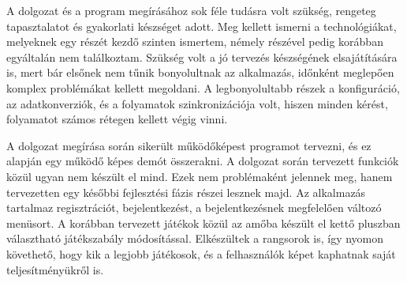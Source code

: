 


A dolgozat és a program megírásához sok féle tudásra volt szükség, rengeteg tapasztalatot és gyakorlati készséget adott. Meg kellett ismerni a technológiákat, melyeknek egy részét kezdő szinten ismertem, némely részével pedig korábban egyáltalán nem találkoztam. Szükség volt a jó tervezés készségének elsajátítására is, mert bár elsőnek nem tűnik bonyolultnak az alkalmazás, időnként meglepően komplex problémákat kellett megoldani. A legbonyolultabb részek a konfiguráció, az adatkonverziók, és a folyamatok szinkronizációja volt, hiszen minden kérést, folyamatot számos rétegen kellett végig vinni. 

A dolgozat megírása során sikerült működőképest programot tervezni, és ez alapján egy működő képes demót összerakni. A dolgozat során tervezett funkciók közül ugyan nem készült el mind. Ezek nem problémaként jelennek meg, hanem tervezetten egy későbbi fejlesztési fázis részei lesznek majd.
Az alkalmazás tartalmaz regisztrációt, bejelentkezést, a bejelentkezésnek megfelelően változó menüsort. A korábban tervezett játékok közül az amőba készült el kettő pluszban választható játékszabály módosítással. Elkészültek a rangsorok is, így nyomon követhető, hogy kik a legjobb játékosok, és a felhasználók képet kaphatnak saját teljesítményükről is.







